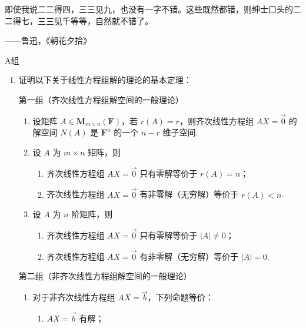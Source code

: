 \vspace{2ex}
{\kaishu 即使我说二二得四，三三见九，也没有一字不错。这些既然都错，则绅士口头的二二得七，三三见千等等，自然就不错了。}
\begin{flushright}
    \kaishu
    ——鲁迅，《朝花夕拾》
\end{flushright}

\centerline{\heiti A组}
\begin{enumerate}
    \item 证明以下关于线性方程组解的理论的基本定理：

          第一组（齐次线性方程组解空间的一般理论）
          \begin{enumerate}
              \item 设矩阵 $A \in \mathbf{M}_{m\times n}(\mathbf{F})$，若 $r(A)=r$，则齐次线性方程组 $AX=\vec{0}$ 的解空间 $N(A)$ 是 $\mathbf{F}^n$ 的一个 $n-r$ 维子空间.

              \item 设 $A$ 为 $m \times n$ 矩阵，则
                    \begin{enumerate}
                        \item 齐次线性方程组 $AX=\vec{0}$ 只有零解等价于 $r(A)=n$；

                        \item 齐次线性方程组 $AX=\vec{0}$ 有非零解（无穷解）等价于 $r(A)<n$.
                    \end{enumerate}

              \item 设 $A$ 为 $n$ 阶矩阵，则
                    \begin{enumerate}
                        \item 齐次线性方程组 $AX=\vec{0}$ 只有零解等价于 $|A|\neq 0$；

                        \item 齐次线性方程组 $AX=\vec{0}$ 有非零解（无穷解）等价于 $|A|=0$.
                    \end{enumerate}
          \end{enumerate}

          第二组（非齐次线性方程组解空间的一般理论）
          \begin{enumerate}[resume*]
              \item 对于非齐次线性方程组 $AX=\vec{b}$，下列命题等价：
                    \begin{enumerate}
                        \item $AX=\vec{b}$ 有解；


\end{enumerate}
\end{enumerate}
\end{enumerate}

